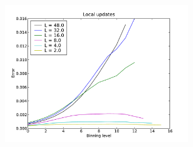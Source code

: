 \href{http://alps.comp-phys.org/vistrails/download.php?getvt=2&db=tutorials&host=alps.ethz.ch&port=3306&tag=&execute=True&showspreadsheetonly=True&version=225}{\includegraphics[width=8cm]{vistrails_images/alps.ethz.ch_tutorials_3306_2_225_pdf/None_None.pdf}
}